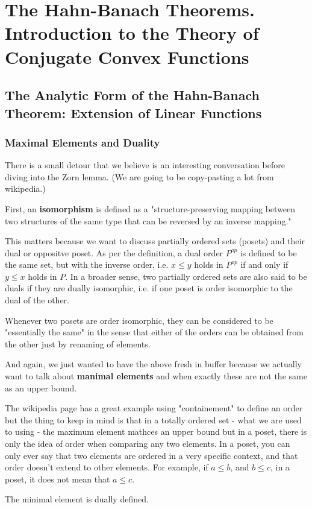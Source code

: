 \section{The Hahn-Banach Theorems. Introduction to the Theory of Conjugate Convex Functions}


\subsection{The Analytic Form of the Hahn-Banach Theorem: Extension of Linear Functions}

\subsubsection{Maximal Elements and Duality}

There is a small detour that we believe is an interesting conversation before diving into the
Zorn lemma. (We are going to be copy-pasting a lot from wikipedia.)

First, an \textbf{isomorphism} is defined as a "structure-preserving mapping between two structures
of the same type that can be reversed by an inverse mapping."

This matters because we want to discuss partially ordered sets (posets) and their dual or oppositve poset.
As per the definition,
a dual order $P^{op}$ is defined to be the same set, but with the inverse order,
i.e. $x \leq y$ holds in $P^{op}$ if and only if $y \leq x$ holds in $P$.
In a broader sense, two partially ordered sets are also said to be duals if they
are dually isomorphic, i.e. if one poset is order isomorphic to the dual of the other.

Whenever two posets are order isomorphic, they can be considered to be "essentially the same"
in the sense that either of the orders can be obtained from the other just by renaming of elements.

And again, we just wanted to have the above fresh in buffer because we actually want to talk about
\textbf{manimal elements} and when exactly these are not the same as an upper bound.

The wikipedia page has a great example using "containement" to define an order but the thing to
keep in mind is that in a totally ordered set - what we are used to using - the maximum element
mathces an upper bound but in a poset, there is only the idea of order when comparing any two elements.
In a poset, you can only ever say that two elements are ordered in a very specific context, and that order
doesn't extend to other elements.
For example, if $a \leq b$, and $b \leq c$, in a poset, it does not mean that $a \leq c$.

The minimal element is dually defined.
